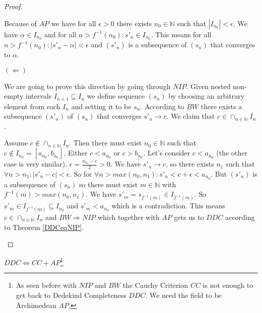 \begin{proof}
\begin{proofpart}
Because of $AP$ we have for all $\epsilon > 0$ there exists $n_0 \in \mathbb{N}$ such that $|I_{n_0}| < \epsilon$. We have $\alpha \in I_{n_0}$ and for all $n > f^{-1}(n_0): s'_n \in I_{n_0}$. This means for all $n > f^{-1}(n_0): |s'_n - \alpha| < \epsilon$ and $(s'_n)$ is a subsequence of $(s_n)$ that converges to $\alpha$.
\end{proofpart}

\noindent$(\Leftarrow)$ 

\begin{proofpart}
We are going to prove this direction by going through $NIP$. Given nested non-empty intervals $I_{n+1} \subseteq I_n$ we define sequence $(s_n)$ by choosing an arbitrary element from each $I_n$ and setting it to be $s_n$. According to $BW$ there exists a subsequence $(s'_n)$ of $(s_n)$ that converges $s'_n \to c$. We claim that $c \in \cap_{n \in \mathbb{N}} I_n$. 
\end{proofpart}
	
\begin{proofpart}
Assume $c \notin \cap_{n \in \mathbb{N}} I_n$. Then there must exist $n_0 \in \mathbb{N}$ such that $c \notin I_{n_0} = [a_{n_0}, b_{n_0}]$. Either $c < a_{n_0}$ or $c > b_{n_0}$. Let's consider $c < a_{n_0}$ (the other case is very similar). $\epsilon = \frac{a_{n_0} - c}{2} > 0$. We have $s'_n \to c$, so there exists $n_1$ such that $\forall n > n_1: |s'_n - c| < \epsilon$. So for $\forall n > max(n_0, n_1): s'_n < c + \epsilon < a_{n_0}$. But $(s'_n)$ is a subsequence of $(s_n)$ so there must exist $m \in \mathbb{N}$ with $f^{-1}(m) > max(n_0, n_1)$. We have $s'_m = s_{f^{-1}(m)} \in I_{f^{-1}(m)}$. So $s'_m \in I_{f^{-1}(m)} \subseteq I_{n_0}$ and $s'_m < a_{n_0}$ which is a contradiction. This means $c \in \cap_{n \in \mathbb{N}} I_n$ and $BW \Rightarrow NIP$ which together with $AP$ gets us to $DDC$ according to Theorem \ref{DDCeqNIP}.
\end{proofpart}
\end{proof}

\begin{thm}
$DDC \Leftrightarrow CC + AP$\footnote{As seen before with $NIP$ and $BW$ the Cauchy Criterion $CC$ is not enough to get back to Dedekind Completeness $DDC$. We need the field to be Archimedean $AP$.}
\end{thm}

